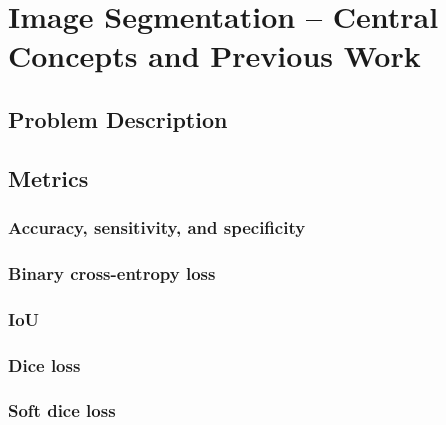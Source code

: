 \section{Image Segmentation -- Central Concepts and Previous Work}


\subsection{Problem Description}
\label{sec:segmentation-description}


\subsection{Metrics}

\label{sec:segmentation-metrics}
  \subsubsection*{Accuracy, sensitivity, and specificity}
  

  \subsubsection*{Binary cross-entropy loss}
  

  \subsubsection*{IoU}
  

  \subsubsection*{Dice loss}
  

  \subsubsection*{Soft dice loss}
  

